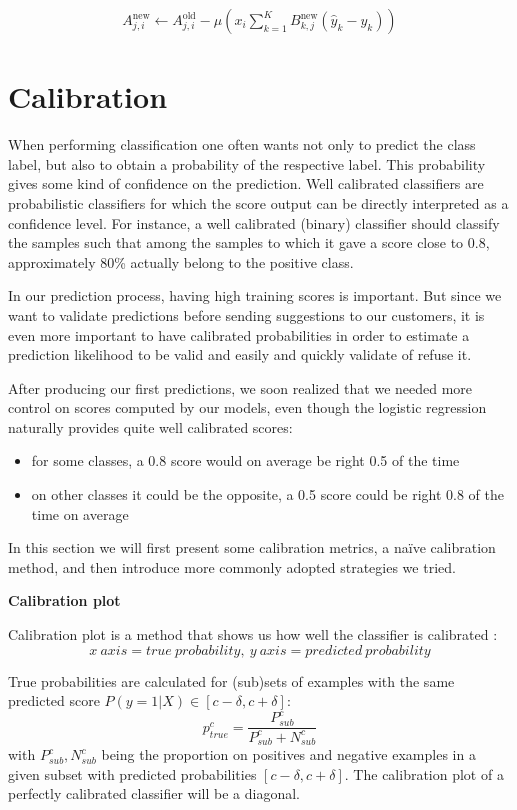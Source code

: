 \begin{align}
	A_{j,i}^{\mbox{new}} \leftarrow A_{j,i}^{\mbox{old}} - 
	\mu 
	\left(
		x_i \sum_{k=1}^K B_{k,j}^{\mbox{new}} (\hat y_k - y_k) 
	\right)
\end{align}



\pagebreak
\section{Calibration}

When performing classification one often wants not only to predict the class label, but also to obtain a probability of the respective label. This probability gives some kind of confidence on the prediction.
Well calibrated classifiers are probabilistic classifiers for which the score output can be directly interpreted as a confidence level. For instance, a well calibrated (binary) classifier should classify the samples such that among the samples to which it gave a score close to 0.8, approximately 80\% actually belong to the positive class.

In our prediction process, having high training scores is important. But since we want to validate predictions before sending suggestions to our customers, it is even more important to have calibrated probabilities in order to estimate a prediction likelihood to be valid and easily and quickly validate of refuse it.

After producing our first predictions, we soon realized that we needed more control on scores computed by our models, even though the logistic regression naturally provides quite well calibrated scores:
\begin{itemize}
	\item for some classes, a 0.8 score would on average be right 0.5 of the time
	\item on other classes it could be the opposite, a 0.5 score could be right 0.8 of the time on average
\end{itemize}

In this section we will first present some calibration metrics, a naïve calibration method, and then introduce more commonly adopted strategies we tried.

\textbf{Calibration plot}

Calibration plot is a method that shows us how well the classifier is calibrated \cite{Calibration}: $$x\ axis = true\ probability,\ y\ axis=predicted\ probability$$

True probabilities are calculated for (sub)sets of examples with the same predicted score $P(y=1|X) \in [c-\delta, c+\delta]$: $$ p_{true}^c = \frac{P_{sub}^c}{P_{sub}^c + N_{sub}^c}$$ with $P_{sub}^c, N_{sub}^c$ being the proportion on positives and negative examples in a given subset with predicted probabilities $[c-\delta, c+\delta]$. The calibration plot of a perfectly calibrated classifier will be a diagonal.

